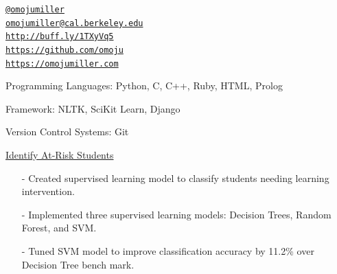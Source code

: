 \documentclass[11pt,article,oneside]{memoir}
\makeatletter
\def\myemail{omojumiller@cal.berkeley.edu}
\def\myweb{https://omojumiller.com}
\def\mytwitter{@omojumiller}
\def\mylinkedin{http://buff.ly/1TXyVq5}
\def\mygithub{https://github.com/omoju}
\makeatother
\begin{document}
\begin{minipage}[t]{2.95in}
  
\end{minipage}
\hfill     
\hfill
\begin{minipage}[t]{1.6in}
  \flushright \footnotesize  \addressblock 
  {\scriptsize  \texttt{\href{http://twitter.com/omojumiller}{\mytwitter}} \, \faTwitter }  \\ 
  {\scriptsize  \texttt{\href{mailto:\myemail}{\myemail}} \, \faEnvelope} \\
  {\scriptsize  \texttt{\href{\mylinkedin}{\mylinkedin}} \, \faLinkedin} \\
  {\scriptsize  \texttt{\href{\mygithub}{\mygithub}} \, \faGithub} \\
  {\scriptsize  \texttt{\href{\myweb}{\myweb}} \, \faGlobe}
\end{minipage}

\medskip

\reversemarginpar

\bigskip       

\medskip

\ind Programming Languages: Python, C, C++, Ruby, HTML, Prolog

\ind Framework: NLTK, SciKit Learn, Django

\ind Version Control Systems: Git


\medskip

\ind \href{https://github.com/omoju/studentIntervention}{Identify At-Risk Students}
\begin{itemize}[noitemsep,nolistsep]
\item[-] Created supervised learning model to classify students needing learning intervention. 
\item[-] Implemented three supervised learning models: Decision Trees, Random Forest, and SVM.
\item[-] Tuned SVM model to improve classification accuracy by 11.2\% over Decision Tree bench mark.
\end{itemize} 
\end{document}
